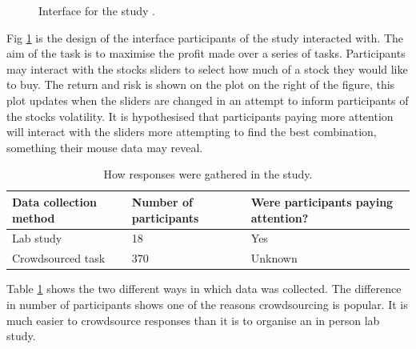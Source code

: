 \documentclass{article}
\begin{document}
\begin{figure}[ht]
    \centering
    \centerline{
    }
    \caption{Interface for the study \cite{tom2018risk}.}
    \label{fig:interface}
\end{figure}

Fig \ref{fig:interface} is the design of the interface participants of the study interacted with.
The aim of the task is to maximise the profit made over a series of tasks.
Participants may interact with the stocks sliders to select how much of a stock they would like to buy.
The return and risk is shown on the plot on the right of the figure, this plot updates when the sliders are changed in an attempt to inform participants of the stocks volatility.
It is hypothesised that participants paying more attention will interact with the sliders more attempting to find the best combination, something their mouse data may reveal.

\begin{table}[ht]
    \caption{\label{table:studies} How responses were gathered in the study.}
    \small
    \begin{tabular}{lll}
        \hline
        Data collection method & Number of participants & Were participants paying attention? \\    \hline
        Lab study              & 18                     & Yes                                 \\
        Crowdsourced task      & 370                    & Unknown                             \\    \hline
    \end{tabular}
\end{table}

Table \ref{table:studies} shows the two different ways in which data was collected.
The difference in number of participants shows one of the reasons crowdsourcing is popular. 
It is much easier to crowdsource responses than it is to organise an in person lab study.
\end{document}
